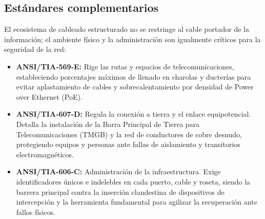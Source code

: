 \documentclass[a4paper,12pt]{article}
\begin{document}
\subsection*{Estándares complementarios}

El ecosistema de cableado estructurado no se restringe al cable portador de la información; el ambiente físico y la administración son igualmente críticos para la seguridad de la red:

\begin{itemize}
    \item \textbf{ANSI/TIA-569-E:} Rige las rutas y espacios de telecomunicaciones, estableciendo porcentajes máximos de llenado en charolas y ducterías para evitar aplastamiento de cables y sobrecalentamiento por densidad de Power over Ethernet (PoE).
    \item \textbf{ANSI/TIA-607-D:} Regula la conexión a tierra y el enlace equipotencial. Detalla la instalación de la Barra Principal de Tierra para Telecomunicaciones (TMGB) y la red de conductores de cobre desnudo, protegiendo equipos y personas ante fallas de aislamiento y transitorios electromagnéticos.
    \item \textbf{ANSI/TIA-606-C:} Administración de la infraestructura. Exige identificadores únicos e indelebles en cada puerto, cable y roseta, siendo la barrera principal contra la inserción clandestina de dispositivos de intercepción y la herramienta fundamental para agilizar la recuperación ante fallos físicos.
\end{itemize}
\end{document}
